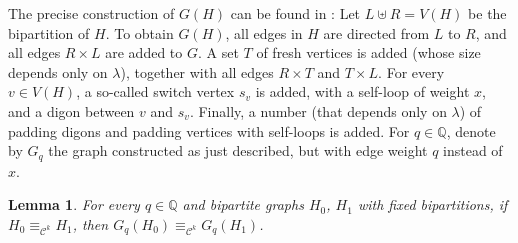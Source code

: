 \documentclass[10pt,a4paper]{article}
\theoremstyle{definition}
\theoremstyle{plain}
\newtheorem{lemma}[definition]{Lemma}
\theoremstyle{remark}
\newcommand{\bbQ}{\mathbb{Q}}
\begin{document}
The precise construction of $G(H)$ can be found in  \cite[Lemma 20]{curticapean2021complexitydichotomyimmanantfamilies}:
Let $L \uplus R = V(H)$ be the bipartition of $H$. To obtain $G(H)$, all edges in $H$ are directed from $L$ to $R$, and all edges $ R \times L$ are added to $G$. A set $T$ of fresh vertices is added (whose size depends only on $\lambda$), together with all edges $R \times T$ and $T \times L$. For every $v \in V(H)$, a so-called switch vertex $s_v$ is added, with a self-loop of weight $x$, and a digon between $v$ and $s_v$. Finally, a number (that depends only on $\lambda$) of padding digons and padding vertices with self-loops is added. 
For $q \in \bbQ$, denote by $G_q$ the graph constructed as just described, but with edge weight $q$ instead of $x$.
\begin{lemma}
	\label{lem:raduReductionPreservesCkEquivalence}
	For every $q \in \bbQ$ and bipartite graphs $H_0$, $H_1$ with fixed bipartitions,
	if $H_0 \equiv_{\mathcal{C}^k} H_1$, then $G_q(H_0) \equiv_{\mathcal{C}^{k}} G_q(H_1)$.
\end{lemma}	
\end{document}
